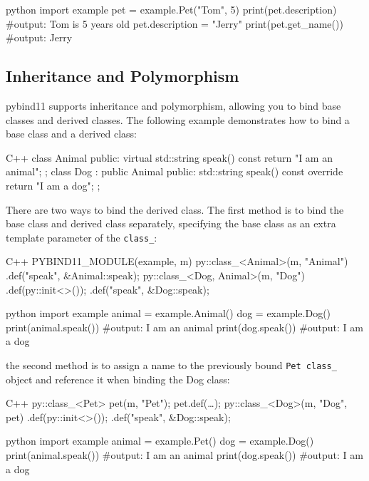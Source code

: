 \begin{neonlisting}{python}
import example
pet = example.Pet("Tom", 5)
print(pet.description) #output: Tom is 5 years old
pet.description = "Jerry"
print(pet.get_name()) #output: Jerry
\end{neonlisting}

\subsection{Inheritance and Polymorphism}

pybind11 supports inheritance and polymorphism, allowing you to bind base classes and derived classes. The following example demonstrates how to bind a base class and a derived class:

\begin{neonlisting}[language=C++]{C++}
class Animal {
public:
    virtual std::string speak() const {
        return "I am an animal";
    }
};
class Dog : public Animal {
public:
    std::string speak() const override {
        return "I am a dog";
    }
};
\end{neonlisting}

There are two ways to bind the derived class. The first method is to bind the base class and derived class separately, specifying the base class as an extra template parameter of the \texttt{class\_}:

\begin{neonlisting}[language=C++]{C++}
PYBIND11_MODULE(example, m) {
    py::class_<Animal>(m, "Animal")
        .def("speak", &Animal::speak);
    py::class_<Dog, Animal>(m, "Dog")
        .def(py::init<>());
        .def("speak", &Dog::speak);
}
\end{neonlisting}

\begin{neonlisting}{python}
import example
animal = example.Animal()
dog = example.Dog()
print(animal.speak()) #output: I am an animal
print(dog.speak()) #output: I am a dog
\end{neonlisting}

the second method is to assign a name to the previously bound \texttt{Pet class\_} object and reference it when binding the Dog class:

\begin{neonlisting}[language=C++]{C++}
py::class_<Pet> pet(m, "Pet");
pet.def(\dots);
py::class_<Dog>(m, "Dog", pet)
    .def(py::init<>());
    .def("speak", &Dog::speak);
\end{neonlisting}

\begin{neonlisting}{python}
import example
animal = example.Pet()
dog = example.Dog()
print(animal.speak()) #output: I am an animal
print(dog.speak()) #output: I am a dog
\end{neonlisting}


